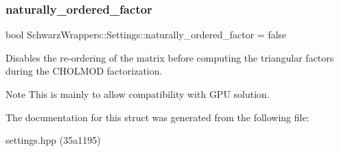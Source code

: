 \subsubsection{\texorpdfstring{naturally\+\_\+ordered\+\_\+factor}{naturally\_ordered\_factor}}
{\footnotesize\ttfamily bool Schwarz\+Wrappers\+::\+Settings\+::naturally\+\_\+ordered\+\_\+factor = false}



Disables the re-\/ordering of the matrix before computing the triangular factors during the C\+H\+O\+L\+M\+OD factorization. 

\begin{DoxyNote}{Note}
This is mainly to allow compatibility with G\+PU solution. 
\end{DoxyNote}


The documentation for this struct was generated from the following file\+:\begin{DoxyCompactItemize}
\item 
settings.\+hpp (35a1195)\end{DoxyCompactItemize}
